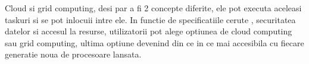 Cloud si grid computing, desi par a fi 2 concepte diferite, ele pot executa aceleasi taskuri si se
pot inlocuii intre ele. In functie de specificatiile cerute , securitatea datelor si accesul la
resurse, utilizatorii pot alege optiunea de cloud computing sau grid computing, ultima optiune
devenind din ce in ce mai accesibila cu fiecare generatie noua de procesoare lansata.


